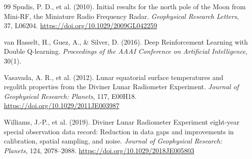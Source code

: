 \documentclass[12pt,a4paper]{article}
\begin{document}
\begin{thebibliography}{99}
Spudis, P. D., et al. (2010).
Initial results for the north pole of the Moon from Mini-RF, the Miniature Radio
Frequency Radar.
\textit{Geophysical Research Letters}, 37, L06204.
\url{https://doi.org/10.1029/2009GL042259}

van Hasselt, H., Guez, A., \& Silver, D. (2016).
Deep Reinforcement Learning with Double Q-learning.
\textit{Proceedings of the AAAI Conference on Artificial Intelligence}, 30(1).

Vasavada, A. R., et al. (2012).
Lunar equatorial surface temperatures and regolith properties from the Diviner
Lunar Radiometer Experiment.
\textit{Journal of Geophysical Research: Planets}, 117, E00H18.
\url{https://doi.org/10.1029/2011JE003987}

Williams, J.-P., et al. (2019).
Diviner Lunar Radiometer Experiment eight-year special observation data record:
Reduction in data gaps and improvements in calibration, spatial sampling, and
noise.
\textit{Journal of Geophysical Research: Planets}, 124, 2078--2088.
\url{https://doi.org/10.1029/2018JE005803}

\end{thebibliography}
\end{document}
